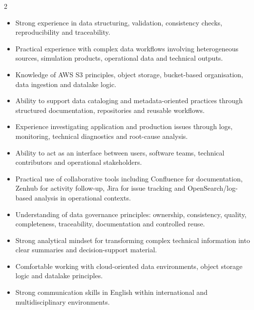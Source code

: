 \documentclass[8pt,a4paper,ragged2e,withhyper]{altacv}
\begin{document}
\begin{paracol}{2}
\begin{itemize}
  \item Strong experience in data structuring, validation, consistency checks, reproducibility and traceability.
  \item Practical experience with complex data workflows involving heterogeneous sources, simulation products, operational data and technical outputs.
  \item Knowledge of AWS S3 principles, object storage, bucket-based organisation, data ingestion and datalake logic.
  \item Ability to support data cataloging and metadata-oriented practices through structured documentation, repositories and reusable workflows.
  \item Experience investigating application and production issues through logs, monitoring, technical diagnostics and root-cause analysis.
  \item Ability to act as an interface between users, software teams, technical contributors and operational stakeholders.
  \item Practical use of collaborative tools including Confluence for documentation, Zenhub for activity follow-up, Jira for issue tracking and OpenSearch/log-based analysis in operational contexts.
  \item Understanding of data governance principles: ownership, consistency, quality, completeness, traceability, documentation and controlled reuse.
  \item Strong analytical mindset for transforming complex technical information into clear summaries and decision-support material.
  \item Comfortable working with cloud-oriented data environments, object storage logic and datalake principles.
  \item Strong communication skills in English within international and multidisciplinary environments.
\end{itemize}


\divider
{}
\divider

\medskip



\divider



\end{paracol}
\end{document}
